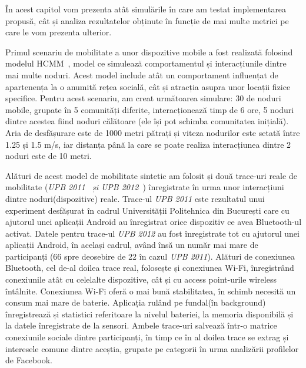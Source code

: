 \documentclass[12pt,a4paper]{report}
\begin{document}
În acest capitol vom prezenta atât simulările în care am testat implementarea propusă, cât și analiza rezultatelor obținute în funcție de mai multe metrici pe care le vom prezenta ulterior.

Primul scenariu de mobilitate a unor dispozitive mobile a fost realizată folosind modelul HCMM~\cite{hcmm}, model ce simulează comportamentul și interacțiunile dintre mai multe noduri. Acest model include atât un comportament influențat de apartenența la o anumită rețea socială, cât și atracția asupra unor locații fizice specifice. Pentru acest scenariu, am creat următoarea simulare: 30 de noduri mobile, grupate în 5 comunități diferite, interacționează timp de 6 ore, 5 noduri dintre acestea fiind noduri călătoare (ele își pot schimba comunitatea inițială). Aria de desfășurare este de 1000 metri pătrați și viteza nodurilor este setată între 1.25 și 1.5 m/s, iar distanța până la care se poate realiza interacțiunea dintre 2 noduri este de 10 metri.

Alături de acest model de mobilitate sintetic am folosit și două trace-uri reale de mobilitate (\textit{UPB 2011~\cite{upb2011} și UPB 2012~\cite{upb2012}}) înregistrate în urma unor interacțiuni dintre noduri(dispozitive) reale. Trace-ul \textit{UPB 2011} este rezultatul unui experiment desfășurat în cadrul Universității Politehnica din București care cu ajutorul unei aplicații Android au înregistrat orice dispozitiv ce avea Bluetooth-ul activat. Datele pentru trace-ul \textit{UPB 2012} au fost înregistrate tot cu ajutorul unei aplicații Android, în același cadrul, având însă un număr mai mare de participanți (66 spre deosebire de 22 în cazul \textit{UPB 2011}). Alături de conexiunea Bluetooth, cel de-al doilea trace real, folosește și conexiunea Wi-Fi, înregistrând conexiunile atât cu celelalte dispozitive, cât și cu access point-urile wireless întâlnite. Conexiunea Wi-Fi oferă o mai bună stabilitatea, în schimb necesită un consum mai mare de baterie. Aplicația rulând pe fundal(în background) înregistrează și statistici referitoare la nivelul bateriei, la memoria disponibilă și la datele înregistrate de la sensori. Ambele trace-uri salvează într-o matrice conexiunile sociale dintre participanți, în timp ce în al doilea trace se extrag și interesele comune dintre aceștia, grupate pe categorii în urma analizării profilelor de Facebook.
\end{document}
